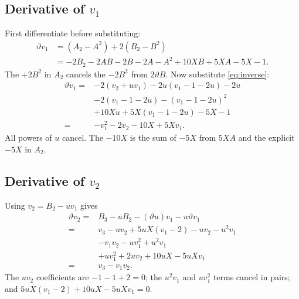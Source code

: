 \documentclass[11pt,a4paper]{article}
\numberwithin{equation}{section}
\newcommand{\tht}{\vartheta}
\begin{document}
\subsection{Derivative of \texorpdfstring{$v_1$}{v1}}
First differentiate before substituting:
\begin{align}
\tht v_1&=(A_2-A^2)+2(B_2-B^2)\\
 &=-2B_2-2AB-2B-2A-A^2+10XB+5XA-5X-1.
\end{align}
The $+2B^2$ in $A_2$ cancels the $-2B^2$ from $2\tht B$.
Now substitute \eqref{eq:inverse}:
\begin{align}
\tht v_1={}&-2(v_2+uv_1)-2u(v_1-1-2u)-2u\\
 &-2(v_1-1-2u)-(v_1-1-2u)^2\\
 &+10Xu+5X(v_1-1-2u)-5X-1\\
={}&-v_1^2-2v_2-10X+5Xv_1.
\end{align}
All powers of $u$ cancel. The $-10X$ is the sum of $-5X$ from
$5XA$ and the explicit $-5X$ in $A_2$.

\subsection{Derivative of \texorpdfstring{$v_2$}{v2}}
Using $v_2=B_2-uv_1$ gives
\begin{align}
\tht v_2={}&B_3-uB_2-(\tht u)v_1-u\tht v_1\\
={}&v_3-uv_2+5uX(v_1-2)-uv_2-u^2v_1\\
 &-v_1v_2-uv_1^2+u^2v_1\\
 &+uv_1^2+2uv_2+10uX-5uXv_1\\
={}&v_3-v_1v_2.
\end{align}
The $uv_2$ coefficients are $-1-1+2=0$; the $u^2v_1$ and
$uv_1^2$ terms cancel in pairs; and
$5uX(v_1-2)+10uX-5uXv_1=0$.
\end{document}
